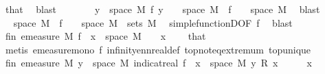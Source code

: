 \begin{isabellebody}
\ that\ \isamarkupfalse%
\ blast\isanewline
\ \ \ \ \isamarkupfalse%
\ \isamarkupfalse%
\ {\isachardoublequoteopen}{\isacharbraceleft}{\kern0pt}y\ {\isasymin}\ space\ M{\isachardot}{\kern0pt}\ f\ y\ {\isasymnoteq}\ {}{\isacharbraceright}{\kern0pt}\ {\isacharequal}{\kern0pt}\ space\ M\ {\isacharminus}{\kern0pt}\ {\isacharparenleft}{\kern0pt}f\ {\isacharminus}{\kern0pt}{\isacharbackquote}{\kern0pt}\ {\isacharbraceleft}{\kern0pt}{}{\isacharbraceright}{\kern0pt}\ {\isasyminter}\ space\ M{\isacharparenright}{\kern0pt}{\isachardoublequoteclose}\ \isamarkupfalse%
\ blast\isanewline
\ \ \ \ \isamarkupfalse%
\ \isamarkupfalse%
\ {\isachardoublequoteopen}space\ M\ {\isacharminus}{\kern0pt}\ {\isacharparenleft}{\kern0pt}f\ {\isacharminus}{\kern0pt}{\isacharbackquote}{\kern0pt}\ {\isacharbraceleft}{\kern0pt}{}{\isacharbraceright}{\kern0pt}\ {\isasyminter}\ space\ M{\isacharparenright}{\kern0pt}\ {\isasymin}\ sets\ M{\isachardoublequoteclose}\ \isamarkupfalse%
\ simple{\isacharunderscore}{\kern0pt}functionD{\isacharparenleft}{\kern0pt}{}{\isacharparenright}{\kern0pt}{\isacharbrackleft}{\kern0pt}OF\ f{\isacharparenleft}{\kern0pt}{}{\isacharparenright}{\kern0pt}{\isacharbrackright}{\kern0pt}\ \isamarkupfalse%
\ blast\isanewline
\ \ \ \ \isamarkupfalse%
\ \isamarkupfalse%
\ fin{\isacharunderscore}{\kern0pt}{}{\isacharcolon}{\kern0pt}\ {\isachardoublequoteopen}emeasure\ M\ {\isacharparenleft}{\kern0pt}f\ {\isacharminus}{\kern0pt}{\isacharbackquote}{\kern0pt}\ {\isacharbraceleft}{\kern0pt}x{\isacharbraceright}{\kern0pt}\ {\isasyminter}\ space\ M{\isacharparenright}{\kern0pt}\ {\isacharless}{\kern0pt}\ {\isasyminfinity}{\isachardoublequoteclose}\ \ {\isachardoublequoteopen}x\ {\isasymnoteq}\ {}{\isachardoublequoteclose}\ \isamarkupfalse%
\ that\ \isamarkupfalse%
\ {\isacharparenleft}{\kern0pt}metis\ emeasure{\isacharunderscore}{\kern0pt}mono\ f{\isacharparenleft}{\kern0pt}{}{\isacharparenright}{\kern0pt}\ infinity{\isacharunderscore}{\kern0pt}ennreal{\isacharunderscore}{\kern0pt}def\ top{\isachardot}{\kern0pt}not{\isacharunderscore}{\kern0pt}eq{\isacharunderscore}{\kern0pt}extremum\ top{\isacharunderscore}{\kern0pt}unique{\isacharparenright}{\kern0pt}\isanewline
\ \ \ \ \isamarkupfalse%
\ fin{\isacharunderscore}{\kern0pt}{}{\isacharcolon}{\kern0pt}\ {\isachardoublequoteopen}emeasure\ M\ {\isacharbraceleft}{\kern0pt}y\ {\isasymin}\ space\ M{\isachardot}{\kern0pt}\ indicat{\isacharunderscore}{\kern0pt}real\ {\isacharparenleft}{\kern0pt}f\ {\isacharminus}{\kern0pt}{\isacharbackquote}{\kern0pt}\ {\isacharbraceleft}{\kern0pt}x{\isacharbraceright}{\kern0pt}\ {\isasyminter}\ space\ M{\isacharparenright}{\kern0pt}\ y\ {\isacharasterisk}{\kern0pt}\isactrlsub R\ x\ {\isasymnoteq}\ {}{\isacharbraceright}{\kern0pt}\ {\isasymnoteq}\ {\isasyminfinity}{\isachardoublequoteclose}\ \ {\isachardoublequoteopen}x\ {\isasymnoteq}\ {}{\isachardoublequoteclose}\ \isamarkupfalse%

\end{isabellebody}
